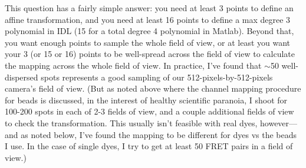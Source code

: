 \documentclass[11pt]{article}
\begin{document}
%

This question has a fairly simple answer: you need at least 3 points to define an affine transformation, and you need at least 16 points to define a max degree 3 polynomial in IDL (15 for a total degree 4 polynomial in Matlab).  Beyond that, you want enough points to sample the whole field of view, or at least you want your 3 (or 15 or 16) points to be well-spread across the field of view to calculate the mapping across the whole field of view.  In practice, I've found that $\sim$50 well-dispersed spots represents a good sampling of our 512-pixels-by-512-pixels camera's field of view. (But as noted above where the channel mapping procedure for beads is discussed, in the interest of healthy scientific paranoia, I shoot for 100-200 spots in each of 2-3 fields of view, and a couple additional fields of view to check the transformation.  This usually isn't feasible with real dyes, however---and as noted below, I've found the mapping to be different for dyes vs the beads I use.  In the case of single dyes, I try to get at least 50 FRET pairs in a field of view.)
\end{document}
